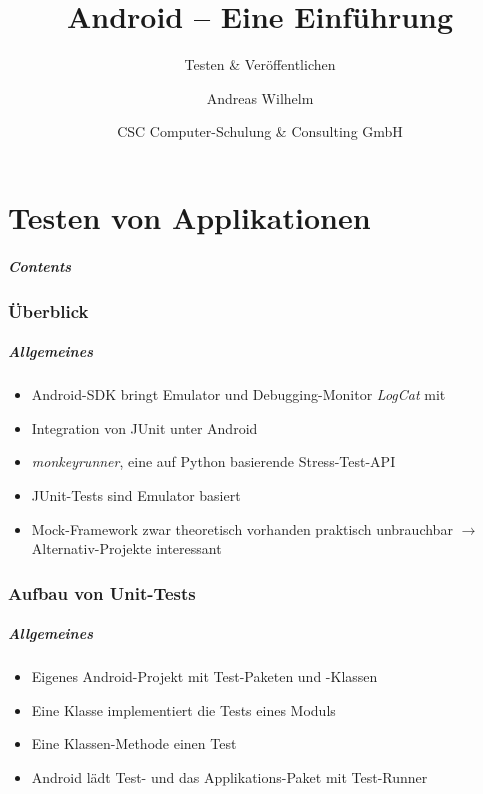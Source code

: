 \title{Android -- Eine Einführung}
\subtitle{Testen \& Veröffentlichen}
\author[A. Wilhelm]{Andreas Wilhelm}
\titlegraphic{}
\date{CSC Computer-Schulung \& Consulting GmbH}

\begin{frame}[plain]
  \titlepage
\end{frame}

\part{Testen von Applikationen}
\frame{\partpage}
\begin{frame}
	\frametitle{Contents}
	\tableofcontents[]
\end{frame}

\section{Überblick}
\begin{frame}
	\frametitle{Allgemeines}
	\begin{itemize}
		\item Android-SDK bringt Emulator und Debugging-Monitor \emph{LogCat} 
			mit
		\item Integration von JUnit unter Android
		\item \emph{monkeyrunner}, eine auf Python basierende Stress-Test-API
		\item JUnit-Tests sind Emulator basiert
		\item Mock-Framework zwar theoretisch vorhanden praktisch unbrauchbar
			$\rightarrow$ Alternativ-Projekte interessant
	\end{itemize}
\end{frame}

\section{Aufbau von Unit-Tests}
\begin{frame}
	\frametitle{Allgemeines}
	\begin{itemize}
		\item Eigenes Android-Projekt mit Test-Paketen und -Klassen
		\item Eine Klasse implementiert die Tests eines Moduls
		\item Eine Klassen-Methode einen Test
		\item Android lädt Test- und das Applikations-Paket mit Test-Runner
	\end{itemize}
\end{frame}

